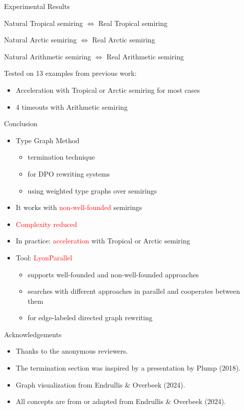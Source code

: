 \documentclass{beamer}
\begin{document}
\begin{frame}{Experimental Results}
  \begin{center}
     Natural Tropical semiring $\Leftrightarrow$ Real Tropical semiring
  \end{center}
  \begin{center}
     Natural Arctic semiring $\Leftrightarrow$ Real Arctic semiring
  \end{center}
  \begin{center}
    Natural Arithmetic semiring $\Leftrightarrow$ Real Arithmetic semiring
  \end{center}

  Tested on 13 examples from previous work:
  \begin{itemize}
    \item Acceleration with Tropical or Arctic semiring for most cases
    \item 4 timeouts with Arithmetic semiring
  \end{itemize}
\end{frame}

\begin{frame}{Conclusion}
  \begin{itemize}
    \item Type Graph Method 
         \begin{itemize}
          \item termination technique
          \item for DPO rewriting systems
          \item using weighted type graphs over semirings
         \end{itemize}
    \item It works with \textcolor{red}{non-well-founded} semirings
    \item \textcolor{red}{Complexity reduced}
    \item In practice: \textcolor{red}{acceleration} with Tropical or Arctic semiring
    \item Tool: \textcolor{red}{LyonParallel} 
        \begin{itemize}
          \item supports well-founded and non-well-founded approaches
          \item searches with different approaches in parallel and cooperates between them
          \item for edge-labeled directed graph rewriting
        \end{itemize}
  \end{itemize}
\end{frame} 

\begin{frame}{Acknowledgements}
  \begin{itemize}
    \item Thanks to the anonymous reviewers.
    \item The termination section was inspired by a presentation by Plump (2018).
    \item Graph visualization from Endrullis \& Overbeek (2024).
    \item All concepts are from or adapted from Endrullis \& Overbeek (2024).
  \end{itemize}
\end{frame}
\end{document}
